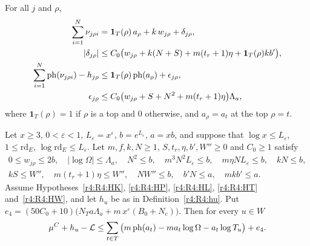 \begin{hypothesis}\label{r4:R4:HW}
For all $j$ and $\rho$,
\begin{align*}
\sum_{i=1}^N\nu_{j\rho i}&=\mathbf 1_T(\rho)\,a_\rho+k\,w_{j\rho}+\delta_{j\rho},\\
\lvert\delta_{j\rho}\rvert&\le C_0\big(w_{j\rho}+k(N+S)+m(t_r+1)\eta+\mathbf 1_T(\rho)kb'\big),\\
\sum_{i=1}^N\operatorname{ph}(\nu_{j\rho i})-h_{j\rho}&\le\mathbf 1_T(\rho)\operatorname{ph}(a_\rho)+\epsilon_{j\rho},\\
\epsilon_{j\rho}&\le C_0\big(w_{j\rho}+S+N^2+m(t_r+1)\eta\big)\Lambda_a,
\end{align*}
where $\mathbf 1_T(\rho)=1$ if $\rho$ is a top and $0$ otherwise, and $a_\rho=a_t$ at the top $\rho=t$.
\end{hypothesis}

\begin{theorem}\label{r4:R4:A4}
Let $x\ge3$, $0<\varepsilon<1$, $L_\varepsilon=x^\varepsilon$, $b=e^{L_\varepsilon}$, $a=xb$, and suppose that $\log x\le L_\varepsilon$, $1\le\mathrm{rd}_E$, $\log\mathrm{rd}_E\le L_\varepsilon$. Let $m,f,k,N\ge1$, $S,t_r,\eta,b',W''\ge0$ and $C_0\ge1$ satisfy
\begin{gather}
0\le w_{j\rho}\le2b,\quad \lvert\log\Omega\rvert\le\Lambda_a,\quad N^2\le b,\quad m^3N^2L_\varepsilon\le b,\quad m\eta NL_\varepsilon\le b,\quad kN\le b,\label{r4:R4:sz1}\\
kS\le W'',\quad m(t_r+1)\eta\le W'',\quad NW''\le b,\quad b'N\le a,\quad mkb'\le a.\label{r4:R4:sz2}
\end{gather}
Assume Hypotheses~\ref{r4:R4:HK}, \ref{r4:R4:HP}, \ref{r4:R4:HL}, \ref{r4:R4:HT} and~\ref{r4:R4:HW}, and let $h_u$ be as in Definition~\ref{r4:R4:hu}. Put $e_4=(50C_0+10)\big(N_Ta\Lambda_a+m\,x^\varepsilon(B_0+N_c)\big)$. Then for every $u\in W$
\[
\mu^C+h_u-\mathcal L\le\sum_{t\in T}\big(m\operatorname{ph}(a_t)-ma_t\log\Omega-a_t\log T_u\big)+e_4 .
\]
\end{theorem}

